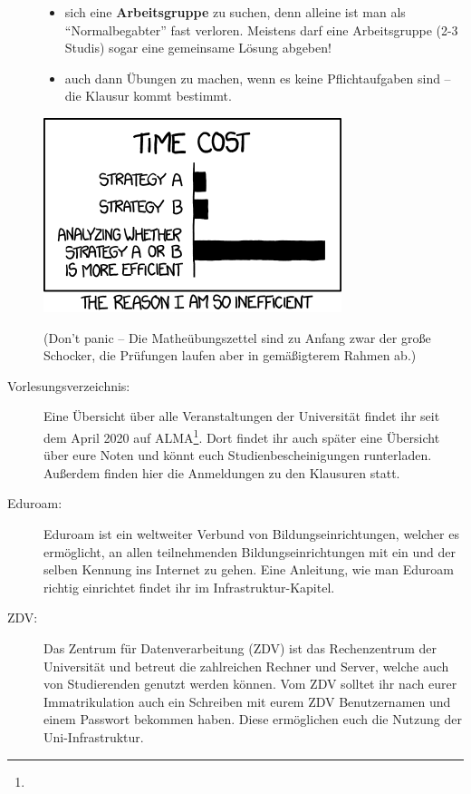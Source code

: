 \begin{description}
\begin{itemize}
\item sich eine \textbf{Arbeitsgruppe} zu suchen, denn alleine ist man
  als "`Normalbegabter"' fast verloren. Meistens darf eine
  Arbeitsgruppe (2-3 Studis) sogar eine gemeinsame Lösung abgeben!

\item auch dann Übungen zu machen, wenn es keine Pflichtaufgaben sind --
  die Klausur kommt bestimmt.

\end {itemize}

\begin{center}
\includegraphics[width=0.5\hsize]{shared/xkcd/efficiency.png}
\end{center}


(Don't panic -- Die Matheübungszettel sind zu Anfang zwar der gro\ss e
  Schocker, die Prüfungen laufen aber in gemä\ss igterem Rahmen ab.)

\item [Vorlesungsverzeichnis:] Eine Übersicht über alle Veranstaltungen der Universität findet ihr seit dem April 2020 auf ALMA\footnote{}. Dort findet ihr auch später eine Übersicht über eure Noten und könnt euch Studienbescheinigungen runterladen.
Außerdem finden hier die Anmeldungen zu den Klausuren statt.
 
\item [Eduroam:] Eduroam ist ein weltweiter Verbund von Bildungseinrichtungen, welcher es ermöglicht, an allen teilnehmenden Bildungseinrichtungen mit ein und der selben Kennung ins Internet zu gehen.
Eine Anleitung, wie man Eduroam richtig einrichtet findet ihr im Infrastruktur-Kapitel.

\item [ZDV:] Das Zentrum für Datenverarbeitung (ZDV) ist das Rechenzentrum der Universität und betreut die zahlreichen Rechner und Server, welche auch von Studierenden genutzt werden können. Vom ZDV solltet ihr nach eurer Immatrikulation auch ein Schreiben mit eurem ZDV Benutzernamen und einem Passwort bekommen haben. Diese ermöglichen euch die Nutzung der Uni-Infrastruktur.


\end{description}
